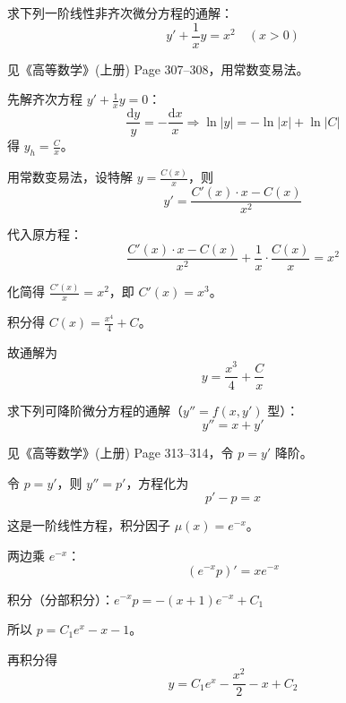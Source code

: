 \documentclass[answer]{THUExam}
\begin{document}
\begin{problem}
求下列一阶线性非齐次微分方程的通解：
$$y' + \frac{1}{x}y = x^2 \quad (x > 0)$$
\end{problem}
\begin{note}
    见《高等数学》(上册) Page 307--308，用常数变易法。
\end{note}
\begin{solution}
    先解齐次方程 $y' + \frac{1}{x}y = 0$：
    $$\frac{\mathrm{d}y}{y} = -\frac{\mathrm{d}x}{x} \Rightarrow \ln|y| = -\ln|x| + \ln|C|$$
    得 $y_h = \frac{C}{x}$。
    
    用常数变易法，设特解 $y = \frac{C(x)}{x}$，则
    $$y' = \frac{C'(x) \cdot x - C(x)}{x^2}$$
    
    代入原方程：
    $$\frac{C'(x) \cdot x - C(x)}{x^2} + \frac{1}{x} \cdot \frac{C(x)}{x} = x^2$$
    
    化简得 $\frac{C'(x)}{x} = x^2$，即 $C'(x) = x^3$。
    
    积分得 $C(x) = \frac{x^4}{4} + C$。
    
    故通解为
    $$\boxed{y = \frac{x^3}{4} + \frac{C}{x}}$$
\end{solution}
\bigskip

\begin{problem}
求下列可降阶微分方程的通解（$y'' = f(x, y')$ 型）：
$$y'' = x + y'$$
\end{problem}
\begin{note}
    见《高等数学》(上册) Page 313--314，令 $p = y'$ 降阶。
\end{note}
\begin{solution}
    令 $p = y'$，则 $y'' = p'$，方程化为
    $$p' - p = x$$
    
    这是一阶线性方程，积分因子 $\mu(x) = e^{-x}$。
    
    两边乘 $e^{-x}$：
    $$(e^{-x}p)' = xe^{-x}$$
    
    积分（分部积分）：$e^{-x}p = -(x+1)e^{-x} + C_1$
    
    所以 $p = C_1e^x - x - 1$。
    
    再积分得
    $$\boxed{y = C_1e^x - \frac{x^2}{2} - x + C_2}$$
\end{solution}
\bigskip
\end{document}
